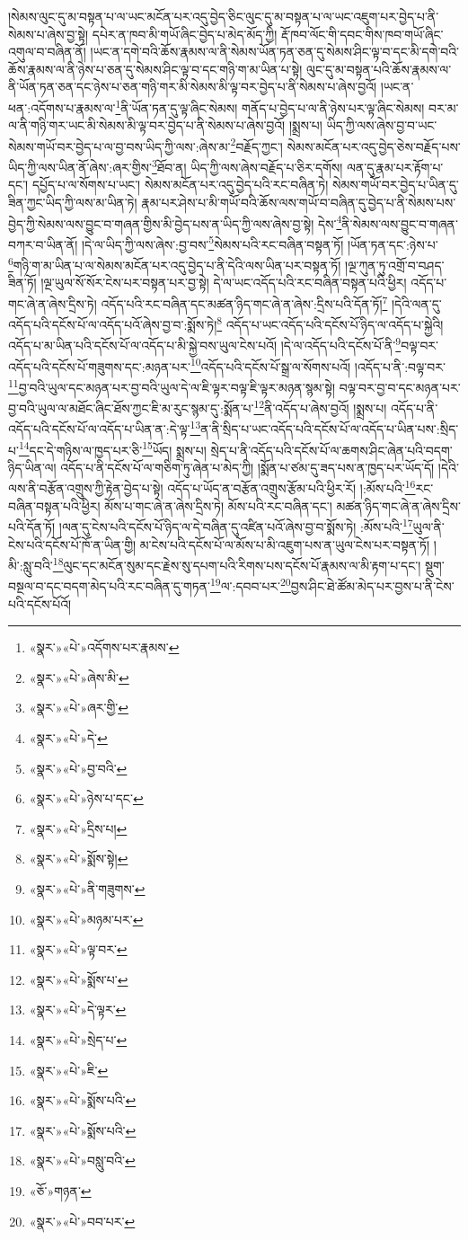 །སེམས་ལུང་དུ་མ་བསྟན་པ་ལ་ཡང་མངོན་པར་འདུ་བྱེད་ཅིང་ལུང་དུ་མ་བསྟན་པ་ལ་ཡང་འཇུག་པར་བྱེད་པ་ནི་སེམས་པ་ཞེས་བྱ་སྟེ། དཔེར་ན་ཁབ་མི་གཡོ་ཞིང་བྱེད་པ་མེད་མོད་ཀྱི། རྡོ་ཁབ་ལོང་གི་དབང་གིས་ཁབ་གཡོ་ཞིང་འགུལ་བ་བཞིན་ནོ། །ཡང་ན་དགེ་བའི་ཆོས་རྣམས་ལ་ནི་སེམས་ཡོན་ཏན་ཅན་དུ་སེམས་ཤིང་ལྟ་བ་དང་མི་དགེ་བའི་ཆོས་རྣམས་ལ་ནི་ཉེས་པ་ཅན་དུ་སེམས་ཤིང་ལྟ་བ་དང་གཉི་ག་མ་ཡིན་པ་སྟེ། ལུང་དུ་མ་བསྟན་པའི་ཆོས་རྣམས་ལ་ནི་ཡོན་ཏན་ཅན་དང་ཉེས་པ་ཅན་གཉི་གར་མི་སེམས་མི་ལྟ་བར་བྱེད་པ་ནི་སེམས་པ་ཞེས་བྱའོ། །ཡང་ན་ཕན་:འདོགས་པ་རྣམས་ལ་\footnote{«སྣར་»«པེ་»འདོགས་པར་རྣམས་}ནི་ཡོན་ཏན་དུ་ལྟ་ཞིང་སེམས། གནོད་པ་བྱེད་པ་ལ་ནི་ཉེས་པར་ལྟ་ཞིང་སེམས། བར་མ་ལ་ནི་གཉི་གར་ཡང་མི་སེམས་མི་ལྟ་བར་བྱེད་པ་ནི་སེམས་པ་ཞེས་བྱའོ། །སྨྲས་པ། ཡིད་ཀྱི་ལས་ཞེས་བྱ་བ་ཡང་སེམས་གཡོ་བར་བྱེད་པ་ལ་བྱ་བས་ཡིད་ཀྱི་ལས་:ཞེས་མ་\footnote{«སྣར་»«པེ་»ཞེས་མི་}བརྗོད་ཀྱང་། སེམས་མངོན་པར་འདུ་བྱེད་ཅེས་བརྗོད་པས་ཡིད་ཀྱི་ལས་ཡིན་ནོ་ཞེས་:ཞར་གྱིས་\footnote{«སྣར་»«པེ་»ཞར་གྱི་}ཐོབ་ན། ཡིད་ཀྱི་ལས་ཞེས་བརྗོད་པ་ཅིར་དགོས། ལན་དུ་རྣམ་པར་རྟོག་པ་དང་། དཔྱོད་པ་ལ་སོགས་པ་ཡང་། སེམས་མངོན་པར་འདུ་བྱེད་པའི་རང་བཞིན་ཏེ། སེམས་གཡོ་བར་བྱེད་པ་ཡིན་དུ་ཟིན་ཀྱང་ཡིད་ཀྱི་ལས་མ་ཡིན་ཏེ། རྣམ་པར་ཤེས་པ་མི་གཡོ་བའི་ཆོས་ལས་གཡོ་བ་བཞིན་དུ་བྱེད་པ་ནི་སེམས་པས་བྱེད་ཀྱི་སེམས་ལས་བྱུང་བ་གཞན་གྱིས་མི་བྱེད་པས་ན་ཡིད་ཀྱི་ལས་ཞེས་བྱ་སྟེ། དེས་\footnote{«སྣར་»«པེ་»དེ་}ནི་སེམས་ལས་བྱུང་བ་གཞན་བཀར་བ་ཡིན་ནོ། །དེ་ལ་ཡིད་ཀྱི་ལས་ཞེས་:བྱ་བས་\footnote{«སྣར་»«པེ་»བྱ་བའི་}སེམས་པའི་རང་བཞིན་བསྟན་ཏོ། །ཡོན་ཏན་དང་:ཉེས་པ་\footnote{«སྣར་»«པེ་»ཉེས་པ་དང་}གཉི་ག་མ་ཡིན་པ་ལ་སེམས་མངོན་པར་འདུ་བྱེད་པ་ནི་དེའི་ལས་ཡིན་པར་བསྟན་ཏོ། །ལྔ་ཀུན་ཏུ་འགྲོ་བ་བཤད་ཟིན་ཏོ། །ལྔ་ཡུལ་སོ་སོར་ངེས་པར་བསྟན་པར་བྱ་སྟེ། དེ་ལ་ཡང་འདོད་པའི་རང་བཞིན་བསྟན་པའི་ཕྱིར། འདོད་པ་གང་ཞེ་ན་ཞེས་དྲིས་ཏེ། འདོད་པའི་རང་བཞིན་དང་མཚན་ཉིད་གང་ཞེ་ན་ཞེས་:དྲིས་པའི་དོན་ཏོ།\footnote{«སྣར་»«པེ་»དྲིས་པ།} །དེའི་ལན་དུ་འདོད་པའི་དངོས་པོ་ལ་འདོད་པའོ་ཞེས་བྱ་བ་:སྨོས་ཏེ།\footnote{«སྣར་»«པེ་»སྨོས་སྟེ།} འདོད་པ་ཡང་འདོད་པའི་དངོས་པོ་ཉིད་ལ་འདོད་པ་སྐྱེའི། འདོད་པ་མ་ཡིན་པའི་དངོས་པོ་ལ་འདོད་པ་མི་སྐྱེ་བས་ཡུལ་ངེས་པའོ། །དེ་ལ་འདོད་པའི་དངོས་པོ་ནི་\footnote{«སྣར་»«པེ་»ནི་གཟུགས་}བལྟ་བར་འདོད་པའི་དངོས་པོ་གཟུགས་དང་:མཉན་པར་\footnote{«སྣར་»«པེ་»མཉམ་པར་}འདོད་པའི་དངོས་པོ་སྒྲ་ལ་སོགས་པའོ། །འདོད་པ་ནི་:བལྟ་བར་\footnote{«སྣར་»«པེ་»ལྟ་བར་}བྱ་བའི་ཡུལ་དང་མཉན་པར་བྱ་བའི་ཡུལ་དེ་ལ་ཇི་ལྟར་བལྟ་ཇི་ལྟར་མཉན་སྙམ་སྟེ། བལྟ་བར་བྱ་བ་དང་མཉན་པར་བྱ་བའི་ཡུལ་ལ་མཐོང་ཞིང་ཐོས་ཀྱང་ཇི་མ་རུང་སྙམ་དུ་:སྨོན་པ་\footnote{«སྣར་»«པེ་»སྨོས་པ་}ནི་འདོད་པ་ཞེས་བྱའོ། །སྨྲས་པ། འདོད་པ་ནི་འདོད་པའི་དངོས་པོ་ལ་འདོད་པ་ཡིན་ན་:དེ་ལྟ་\footnote{«སྣར་»«པེ་»དེ་ལྟར་}ན་ནི་སྲིད་པ་ཡང་འདོད་པའི་དངོས་པོ་ལ་འདོད་པ་ཡིན་པས་:སྲིད་པ་\footnote{«སྣར་»«པེ་»སྲེད་པ་}དང་དེ་གཉིས་ལ་ཁྱད་པར་ཅི་\footnote{«སྣར་»«པེ་»ཇི་}ཡོད། སྨྲས་པ། སྲེད་པ་ནི་འདོད་པའི་དངོས་པོ་ལ་ཆགས་ཤིང་ཞེན་པའི་བདག་ཉིད་ཡིན་ལ། འདོད་པ་ནི་དངོས་པོ་ལ་གཅིག་ཏུ་ཞེན་པ་མེད་ཀྱི། །སྨོན་པ་ཙམ་དུ་ཟད་པས་ན་ཁྱད་པར་ཡོད་དོ། །དེའི་ལས་ནི་བརྩོན་འགྲུས་ཀྱི་རྟེན་བྱེད་པ་སྟེ། འདོད་པ་ཡོད་ན་བརྩོན་འགྲུས་རྩོམ་པའི་ཕྱིར་རོ། །:མོས་པའི་\footnote{«སྣར་»«པེ་»སྨོས་པའི་}རང་བཞིན་བསྟན་པའི་ཕྱིར། མོས་པ་གང་ཞེ་ན་ཞེས་དྲིས་ཏེ། མོས་པའི་རང་བཞིན་དང་། མཚན་ཉིད་གང་ཞེ་ན་ཞེས་དྲིས་པའི་དོན་ཏོ། །ལན་དུ་ངེས་པའི་དངོས་པོ་ཉིད་ལ་དེ་བཞིན་དུ་འཛིན་པའོ་ཞེས་བྱ་བ་སྨོས་ཏེ། :མོས་པའི་\footnote{«སྣར་»«པེ་»སྨོས་པའི་}ཡུལ་ནི་ངེས་པའི་དངོས་པོ་ཁོ་ན་ཡིན་གྱི། མ་ངེས་པའི་དངོས་པོ་ལ་མོས་པ་མི་འཇུག་པས་ན་ཡུལ་ངེས་པར་བསྟན་ཏོ། །མི་:སླུ་བའི་\footnote{«སྣར་»«པེ་»བསླུ་བའི་}ལུང་དང་མངོན་སུམ་དང་རྗེས་སུ་དཔག་པའི་རིགས་པས་དངོས་པོ་རྣམས་ལ་མི་རྟག་པ་དང་། སྡུག་བསྔལ་བ་དང་བདག་མེད་པའི་རང་བཞིན་དུ་གཏན་\footnote{«ཅོ་»གཉན་}ལ་:དབབ་པར་\footnote{«སྣར་»«པེ་»བབ་པར་}བྱས་ཤིང་ཐེ་ཚོམ་མེད་པར་བྱས་པ་ནི་ངེས་པའི་དངོས་པོའོ། 